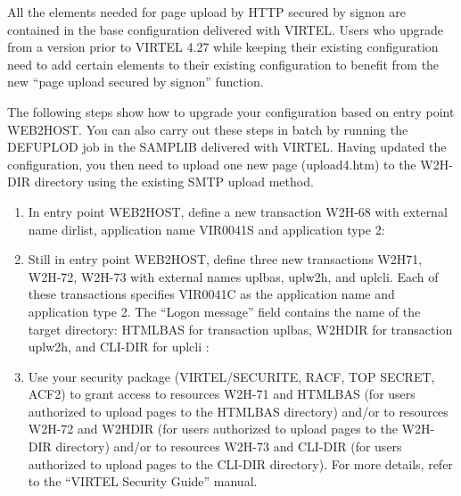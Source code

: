 \documentclass[letterpaper,10pt,english]{sphinxmanual}
\begin{document}

All the elements needed for page upload by HTTP secured by signon are contained in the base configuration delivered with VIRTEL. Users who upgrade from a version prior to VIRTEL 4.27 while keeping their existing configuration need to add certain elements to their existing configuration to benefit from the new “page upload secured by signon” function.

The following steps show how to upgrade your configuration based on entry point WEB2HOST. You can also carry out these steps in batch by running the DEFUPLOD job in the SAMPLIB delivered with VIRTEL. Having updated the configuration, you then need to upload one new page (upload4.htm) to the W2H-DIR directory using the existing SMTP upload method.
\begin{enumerate}
\item {} 
In entry point WEB2HOST, define a new transaction W2H-68 with external name dirlist, application name VIR0041S and application type 2:

\end{enumerate}

\begin{enumerate}
\setcounter{enumi}{1}
\item {} 
Still in entry point WEB2HOST, define three new transactions W2H\textendash{}71, W2H-72, W2H-73 with external names uplbas, uplw2h, and uplcli. Each of these transactions specifies VIR0041C as the application name and application type 2. The “Logon message” field contains the name of the target directory: HTMLBAS for transaction uplbas, W2HDIR for transaction uplw2h, and CLI-DIR for uplcli :

\end{enumerate}

 

 

 
\begin{enumerate}
\setcounter{enumi}{2}
\item {} 
Use your security package (VIRTEL/SECURITE, RACF, TOP SECRET, ACF2) to grant access to resources W2H-71 and HTMLBAS (for users authorized to upload pages to the HTMLBAS directory) and/or to resources W2H-72 and W2HDIR (for users authorized to upload pages to the W2H-DIR directory) and/or to resources W2H-73 and CLI-DIR (for users authorized to upload pages to the CLI-DIR directory). For more details, refer to the “VIRTEL Security Guide” manual.

\end{enumerate}
\end{document}
